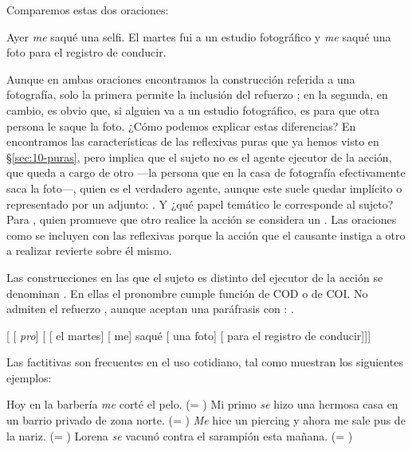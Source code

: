 Comparemos estas dos oraciones:

\begin{exe}
  \ex\label{ex:10-selfi} Ayer \textit{me} saqué una selfi.
  \ex\label{ex:10-foto} El martes fui a un estudio fotográfico y \textit{me}
      saqué una foto para el registro de conducir.
\end{exe}

Aunque en ambas oraciones encontramos la construcción  referida a
una fotografía, solo la primera permite la inclusión del refuerzo ; en la segunda, en cambio, es obvio que, si alguien va a un estudio
fotográfico, es para que otra persona le saque la foto. ¿Cómo podemos explicar
estas diferencias? En  encontramos las características de las
reflexivas puras que ya hemos visto en §\ref{sec:10-puras}, pero
 implica que el sujeto no es el agente ejecutor de la acción,
que queda a cargo de otro ---la persona que en la casa de fotografía
efectivamente saca la foto---, quien es el verdadero agente, aunque este suele
quedar implícito o representado por un adjunto: . Y ¿qué papel temático le corresponde al sujeto? Para
\textcite{kovacci1992}, quien promueve que otro realice la acción se considera un
. Las oraciones como  se incluyen
con las reflexivas porque la acción que el causante instiga a otro a realizar
revierte sobre él mismo.

Las construcciones en las que el sujeto es distinto del ejecutor de la acción se
denominan . En ellas el pronombre cumple función
de COD o de COI. No admiten el refuerzo , aunque aceptan una
paráfrasis con : .

\begin{exe}
  \ex {}[ [ \textit{pro}] [ [ el
      martes] [ me] saqué [ una foto]
      [ para el registro de conducir]]]
\end{exe}

Las factitivas son frecuentes en el uso cotidiano, tal como muestran los
siguientes ejemplos:

\begin{exe}
  \ex\label{ex:10-barberia} Hoy en la barbería \textit{me} corté el pelo. (=
      )
  \ex Mi primo \textit{se} hizo una hermosa casa en un barrio privado de zona
      norte. (= )
  \ex \textit{Me} hice un piercing y ahora me sale pus de la nariz. (= )
  \ex\label{ex:10-lorena} Lorena \textit{se} vacunó contra el sarampión esta
      mañana. (= )
\end{exe}

